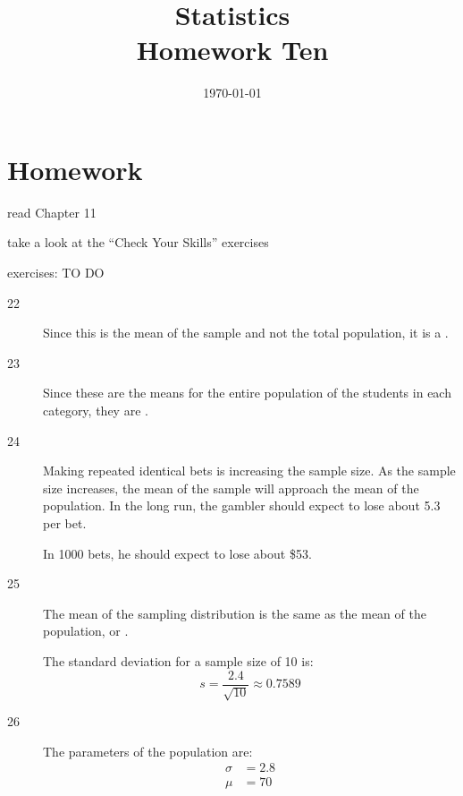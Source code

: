\documentclass[letterpaper, landscape]{exam}
\title{Statistics \\ Homework Ten}
\date{\today}
\author{}
\newcommand{\cent}{\textcent\xspace}
\begin{document}
  \maketitle

  \section{Homework}
  \ifprintanswers
  \else
    \begin{itemize*}
      \item read Chapter 11 
      \item take a look at the ``Check Your Skills'' exercises
      \item exercises: TO DO
    \end{itemize*}
  \fi

  \ifprintanswers
    \begin{description}

      \item[22] Since this is the mean of the sample and not the total
        population, it is a .

      \item[23] Since these are the means for the entire population of the
        students in each category, they are .

      \item[24] Making repeated identical bets is increasing the sample size.
        As the sample size increases, the mean of the sample will approach the
        mean of the population. In the long run, the gambler should expect to
        lose about 5.3\cent per bet.

        In 1000 bets, he should expect to lose about \$53. 

      \item[25] The mean of the sampling distribution is the same as the mean of
        the population, or .

        The standard deviation for a sample size of 10 is:
        \[
          s = \frac{2.4}{\sqrt{10}} \approx \boxed{ 0.7589 }
        \]

      \item[26]
        The parameters of the population are:
        \begin{align*}
          \sigma & = 2.8 \\
          \mu    & = 70 \\
        \end{align*}


\end{description}
\end{document}
